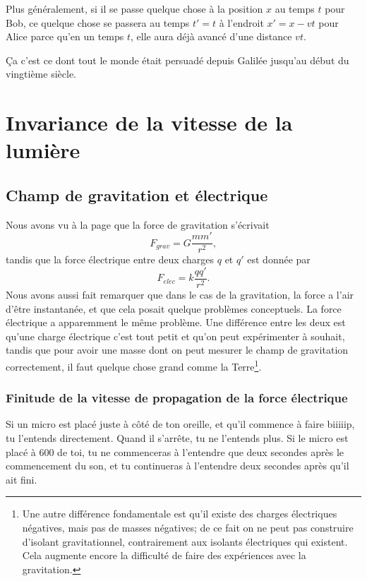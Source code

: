 Plus généralement, si il se passe quelque chose à la position $x$ au temps $t$ pour Bob, ce quelque chose se passera au temps $t'=t$ à l'endroit $x'=x-vt$ pour Alice parce qu'en un temps $t$, elle aura déjà avancé d'une distance $vt$.

Ça c'est ce dont tout le monde était persuadé depuis Galilée jusqu'au début du vingtième siècle.

%
   \section{Invariance de la vitesse de la lumière}
%

\subsection{Champ de gravitation et électrique}

Nous avons vu à la page \pageref{PgForceGrav} que la force de gravitation s'écrivait 
\[ 
  F_{grav}=G\frac{ mm' }{ r^2 },
\]
tandis que la force électrique entre deux charges $q$ et $q'$ est donnée par
\begin{equation}	\label{EqRappelFelec}
  F_{elec}=k\frac{ qq' }{ r^2 }.
\end{equation}
Nous avons aussi fait remarquer que dans le cas de la gravitation, la force a l'air d'être instantanée, et que cela posait quelque problèmes conceptuels. La force électrique a apparemment le même problème. Une différence entre les deux est qu'une charge électrique c'est tout petit et qu'on peut expérimenter à souhait, tandis que pour avoir une masse dont on peut mesurer le champ de gravitation correctement, il faut quelque chose grand comme la Terre\footnote{Une autre différence fondamentale est qu'il existe des charges électriques négatives, mais pas de masses négatives; de ce fait on ne peut pas construire d'isolant gravitationnel, contrairement aux isolants électriques qui existent. Cela augmente encore la difficulté de faire des expériences avec la gravitation.}.

\subsubsection{Finitude de la vitesse de propagation de la force électrique}

Si un micro est placé juste à côté de ton oreille, et qu'il commence à faire biiiiip, tu l'entends directement. Quand il s'arrête, tu ne l'entends plus. Si le micro est placé à \unit{600}{\meter} de toi, tu ne commenceras à l'entendre que deux secondes après le commencement du son, et tu continueras à l'entendre deux secondes après qu'il ait fini.

